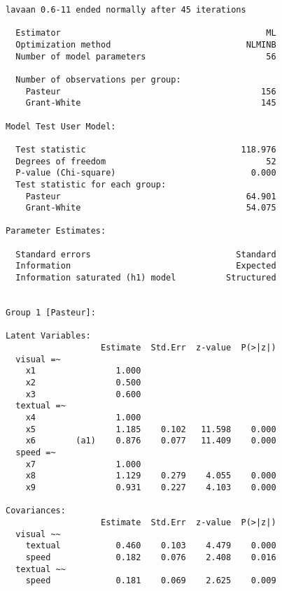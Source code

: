 \begin{verbatim}
lavaan 0.6-11 ended normally after 45 iterations

  Estimator                                         ML
  Optimization method                           NLMINB
  Number of model parameters                        56
                                                      
  Number of observations per group:                   
    Pasteur                                        156
    Grant-White                                    145
                                                      
Model Test User Model:
                                                      
  Test statistic                               118.976
  Degrees of freedom                                52
  P-value (Chi-square)                           0.000
  Test statistic for each group:
    Pasteur                                     64.901
    Grant-White                                 54.075

Parameter Estimates:

  Standard errors                             Standard
  Information                                 Expected
  Information saturated (h1) model          Structured


Group 1 [Pasteur]:

Latent Variables:
                   Estimate  Std.Err  z-value  P(>|z|)
  visual =~                                           
    x1                1.000                           
    x2                0.500                           
    x3                0.600                           
  textual =~                                          
    x4                1.000                           
    x5                1.185    0.102   11.598    0.000
    x6        (a1)    0.876    0.077   11.409    0.000
  speed =~                                            
    x7                1.000                           
    x8                1.129    0.279    4.055    0.000
    x9                0.931    0.227    4.103    0.000

Covariances:
                   Estimate  Std.Err  z-value  P(>|z|)
  visual ~~                                           
    textual           0.460    0.103    4.479    0.000
    speed             0.182    0.076    2.408    0.016
  textual ~~                                          
    speed             0.181    0.069    2.625    0.009


\end{verbatim}
